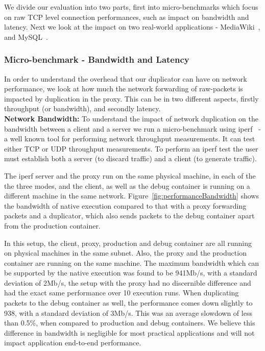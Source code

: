 We divide our evaluation into two parts, first into micro-benchmarks which focus on raw TCP level connection performances, such as impact on bandwidth and latency. Next we look at the impact on two real-world applications - MediaWiki~\cite{mediawiki}, and MySQL~\cite{mysql}.

\subsubsection{Micro-benchmark - Bandwidth and Latency}
\label{sec:microBenchBandwidthLatency}

In order to understand the overhead that our duplicator can have on network performance, we look at how much the network forwarding of raw-packets is impacted by duplication in the proxy. This can be in two different aspects, firstly throughput (or bandwidth), and secondly latency.\\


\noindent\textbf{Network Bandwidth:}
To understand the impact of network duplication on the bandwidth between a client and a server we run a micro-benchmark using iperf~\cite{iperf} - a well known tool for performing network throughput measurements. It can test either TCP or UDP throughput measurements.  To perform an iperf test  the  user must establish both a server (to discard traffic) and a client (to generate traffic).

The iperf server and the proxy run on the same physical machine, in each of the the three modes, and the client, as well as the debug container is running on a different machine in the same network. Figure~\ref{fig:performanceBandwidth} shows the bandwidth of native execution compared to that with a proxy forwarding packets and a duplicator, which also sends packets to the debug container apart from the production container. 

In this setup, the client, proxy, production and debug container are all running on physical machines in the same subnet. Also, the proxy and the production container are running on the same machine. The maximum bandwidth which can be supported by the native execution was found to be 941Mb/s, with a standard deviation of 2Mb/s, the setup with the proxy had no discernible difference and had the exact same performance over 10 execution runs. When duplicating packets to the debug container as well, the performance comes down slightly to 938, with a standard deviation of 3Mb/s. This was an average slowdown of less than 0.5\%, when compared to production and debug containers. We believe this difference in bandwidth is negligible for most practical applications and will not impact application end-to-end performance. \\

